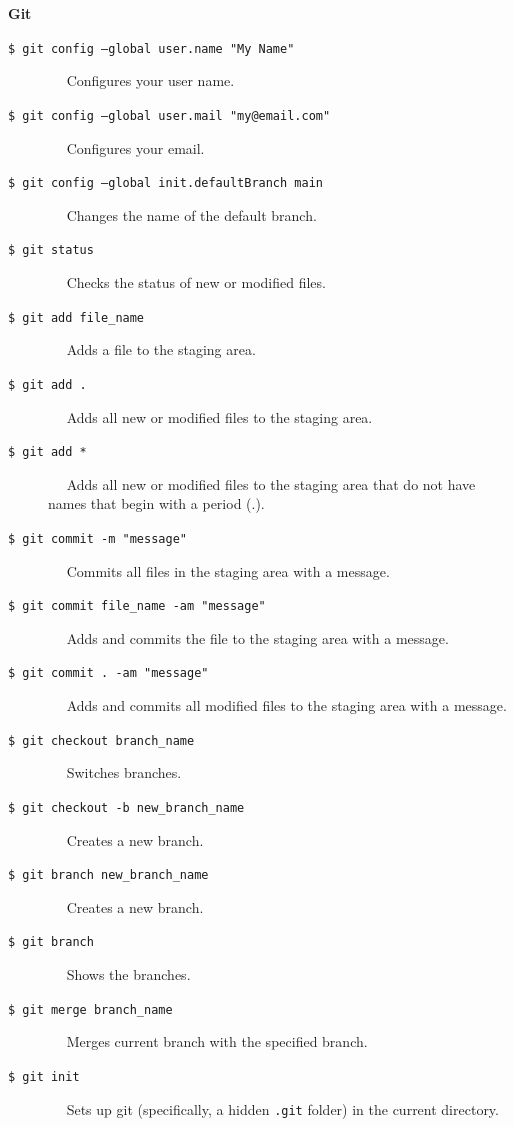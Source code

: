 \documentclass[11pt]{article}
\begin{document}
\newpage

\vspace{.1in}
\begin{tcolorbox}[width=1.03in, sharp corners=all, colback=white!95!black] %
	{\bf Git}
\end{tcolorbox}

\begin{description}
	\item[\texttt{\$ git config --global user.name "My Name"}] $\quad$ Configures your user name.
	\item[\texttt{\$ git config --global user.mail "my@email.com"}] $\quad$ Configures your email.
	\item[\texttt{\$ git config --global init.defaultBranch main}] $\quad$ Changes the name of the default branch.
	\item[\texttt{\$ git status}] $\quad$ Checks the status of new or modified files.
	\item[\texttt{\$ git add file\_name}] $\quad$ Adds a file to the staging area.
	\item[\texttt{\$ git add .}] $\quad$ Adds all new or modified files to the staging area.
	\item[\texttt{\$ git add *}] $\quad$ Adds all new or modified files to the staging area that do not have names that begin with a period (.).
	\item[\texttt{\$ git commit -m "message"}] $\quad$ Commits all files in the staging area with a message.
	\item[\texttt{\$ git commit file\_name -am "message"}] $\quad$ Adds and commits the file to the staging area with a message.
	\item[\texttt{\$ git commit . -am "message"}] $\quad$ Adds and commits all modified files to the staging area with a message.
	\item[\texttt{\$ git checkout branch\_name}] $\quad$ Switches branches.
	\item[\texttt{\$ git checkout -b new\_branch\_name}] $\quad$ Creates a new branch.
	\item[\texttt{\$ git branch new\_branch\_name}] $\quad$ Creates a new branch.
	\item[\texttt{\$ git branch}] $\quad$ Shows the branches.
	\item[\texttt{\$ git merge branch\_name}] $\quad$ Merges current branch with the specified branch.
	\item[\texttt{\$ git init}] $\quad$ Sets up git (specifically, a hidden \texttt{.git} folder) in the current directory. 

\end{description}
\end{document}
